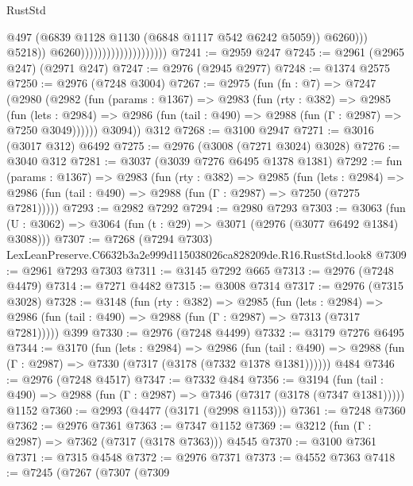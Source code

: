 \begin{lexlean}{RustStd}
\begin{coremodule}
                                                      @497
                                                      (@6839
                                                        @1128
                                                        @1130
                                                        (@6848 @1117 @542 @6242 @5059))
                                                      @6260)))
                                                @5218))
                                            @6260))))))))))))))))))))
@7241 := @2959 @247
@7245 := @2961 (@2965 @247) (@2971 @247)
@7247 := @2976 (@2945 @2977)
@7248 := @1374 @2575
@7250 := @2976 (@7248 @3004)
@7267 := @2975
    (fun (fn : @7) =>
    @7247
      (@2980
        (@2982
          (fun (params : @1367) =>
          @2983
            (fun (rty : @382) =>
            @2985
              (fun (lets : @2984) =>
              @2986 (fun (tail : @490) => @2988 (fun (Γ : @2987) => @7250 @3049))))))
        @3094))
    @312
@7268 := @3100 @2947
@7271 := @3016 (@3017 @312) @6492
@7275 := @2976 (@3008 (@7271 @3024) @3028)
@7276 := @3040 @312
@7281 := @3037 (@3039 @7276 @6495 @1378 @1381)
@7292 := fun (params : @1367) =>
  @2983
    (fun (rty : @382) =>
    @2985
      (fun (lets : @2984) =>
      @2986 (fun (tail : @490) => @2988 (fun (Γ : @2987) => @7250 (@7275 @7281)))))
@7293 := @2982 @7292
@7294 := @2980 @7293
@7303 := @3063 (fun (U : @3062) => @3064 (fun (t : @29) => @3071 (@2976 (@3077 @6492 @1384) @3088)))
@7307 := @7268 (@7294 @7303) LexLeanPreserve.C6632b3a2e999d115038026ca828209de.R16.RustStd.look8
@7309 := @2961 @7293 @7303
@7311 := @3145 @7292 @665
@7313 := @2976 (@7248 @4479)
@7314 := @7271 @4482
@7315 := @3008 @7314
@7317 := @2976 (@7315 @3028)
@7328 := @3148
    (fun (rty : @382) =>
    @2985
      (fun (lets : @2984) =>
      @2986 (fun (tail : @490) => @2988 (fun (Γ : @2987) => @7313 (@7317 @7281)))))
    @399
@7330 := @2976 (@7248 @4499)
@7332 := @3179 @7276 @6495
@7344 := @3170
    (fun (lets : @2984) =>
    @2986
      (fun (tail : @490) => @2988 (fun (Γ : @2987) => @7330 (@7317 (@3178 (@7332 @1378 @1381))))))
    @484
@7346 := @2976 (@7248 @4517)
@7347 := @7332 @484
@7356 := @3194
    (fun (tail : @490) => @2988 (fun (Γ : @2987) => @7346 (@7317 (@3178 (@7347 @1381)))))
    @1152
@7360 := @2993 (@4477 (@3171 (@2998 @1153)))
@7361 := @7248 @7360
@7362 := @2976 @7361
@7363 := @7347 @1152
@7369 := @3212 (fun (Γ : @2987) => @7362 (@7317 (@3178 @7363))) @4545
@7370 := @3100 @7361
@7371 := @7315 @4548
@7372 := @2976 @7371
@7373 := @4552 @7363
@7418 := @7245
    (@7267
      (@7307
        (@7309

\end{coremodule}
\end{lexlean}
